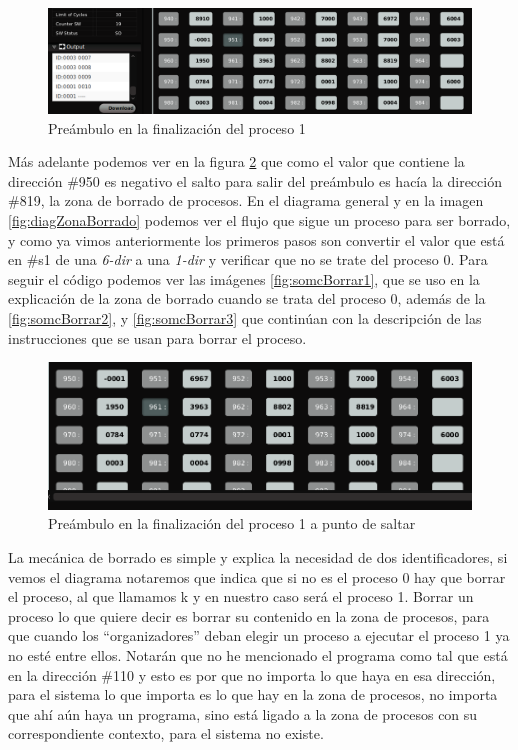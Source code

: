 \documentclass[letterpaper,12pt,oneside]{book}
\begin{document}
		
		\begin{figure}[h]		
			\centering
			\includegraphics[scale=0.4]{media/CARDIACC/proceso1FinishPream_cutted.png}
			\caption{ Preámbulo en la finalización del proceso 1}
			\label{fig:proceso1FinishPream}
		\end{figure}
		
		Más adelante podemos ver en la figura \ref{fig:proceso1FinishPream2} que como el valor que contiene la dirección \#950 es negativo el salto
		para salir del preámbulo es hacía la dirección \#819, la zona de borrado de procesos. En el diagrama general y en la imagen \ref{fig:diagZonaBorrado} podemos
		ver el flujo que sigue un proceso para ser borrado, y como ya vimos anteriormente los primeros pasos son convertir
		el valor que está en \#s1 de una \textit{6-dir} a una \textit{1-dir} y verificar que no se trate del proceso 0. Para seguir
		el código podemos ver las imágenes \ref{fig:somcBorrar1}, que se uso en la explicación de la zona
		de borrado cuando se trata del proceso 0, además de la \ref{fig:somcBorrar2}, y \ref{fig:somcBorrar3} que
		continúan con la descripción de las instrucciones que se usan para 
		borrar el proceso.
		
		
		\begin{figure}[h]		
			\centering
			\includegraphics[scale=0.4]{media/CARDIACC/proceso1FinishPream2_cut.png}
			\caption{ Preámbulo en la finalización del proceso 1 a punto de saltar}
			\label{fig:proceso1FinishPream2}
		\end{figure}
		
		La mecánica de borrado es simple y explica la necesidad de dos identificadores, si vemos el diagrama notaremos que indica que si
		no es el proceso 0 hay que borrar el proceso, al que llamamos k y en nuestro caso será el proceso 1. Borrar un proceso lo que quiere decir es
		borrar su contenido en la zona de procesos, para que cuando los ``organizadores''  deban elegir un proceso a ejecutar el proceso 1 ya no esté entre ellos.
		Notarán que no he mencionado el programa como tal que está en la dirección \#110 y esto es por que no importa lo que haya en esa dirección, para el sistema
		lo que importa es lo que hay en la zona de procesos, no importa que ahí aún haya un programa, sino está ligado a la zona de procesos con su correspondiente
		contexto, para el sistema no existe.
		
\end{document}
